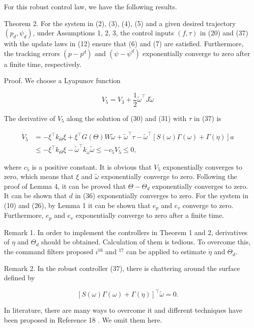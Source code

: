 \documentclass[10pt]{article}
\begin{document}
For this robust control law, we have the following results.

Theorem 2. For the system in (2), (3), (4), (5) and a given desired trajectory $\left(p_{d}, \psi_{d}\right)$, under Assumptions 1, 2, 3, the control inputs $(f, \tau)$ in (20) and (37) with the update laws in (12) ensure that (6) and (7) are satisfied. Furthermore, the tracking errors $\left(p-p^{d}\right)$ and $\left(\psi-\psi^{d}\right)$ exponentially converge to zero after a finite time, respectively.

Proof. We choose a Lyapunov function

$$
V_{5}=V_{3}+\frac{1}{2} \tilde{\omega}^{\top} J \tilde{\omega}
$$

The derivative of $V_{5}$ along the solution of (30) and (31) with $\tau$ in (37) is

$$
\begin{aligned}
\dot{V}_{5} & =-\xi^{\top} k_{\Theta} \xi+\xi^{\top} G(\Theta) W \tilde{\omega}+\tilde{\omega}^{\top} \tau-\tilde{\omega}^{\top}[S(\omega) \Gamma(\omega)+\Gamma(\dot{\eta})] a \\
& \leq-\xi^{\top} k_{\Theta} \xi-\tilde{\omega}^{\top} k_{\omega} \tilde{\omega} \leq-c_{5} V_{5} \leq 0,
\end{aligned}
$$

where $c_{5}$ is a positive constant. It is obvious that $V_{5}$ exponentially converges to zero, which means that $\xi$ and $\tilde{\omega}$ exponentially converge to zero. Following the proof of Lemma 4, it can be proved that $\Theta-\Theta_{d}$ exponentially converges to zero. It can be shown that $d$ in (36) exponentially converges to zero. For the system in (10) and (26), by Lemma 1 it can be shown that $e_{p}$ and $e_{v}$ converge to zero. Furthermore, $e_{p}$ and $e_{v}$ exponentially converge to zero after a finite time.

Remark 1. In order to implement the controllers in Theorem 1 and 2, derivatives of $\eta$ and $\Theta_{d}$ should be obtained. Calculation of them is tedious. To overcome this, the command filters proposed $i^{16}$ and $^{17}$ can be applied to estimate $\dot{\eta}$ and $\dot{\Theta}_{d}$.

Remark 2. In the robust controller (37), there is chattering around the surface defined by

$$
[S(\omega) \Gamma(\omega)+\Gamma(\dot{\eta})]^{\top} \tilde{\omega}=0 .
$$

In literature, there are many ways to overcome it and different techniques have been proposed in Reference 18 . We omit them here.
\end{document}
